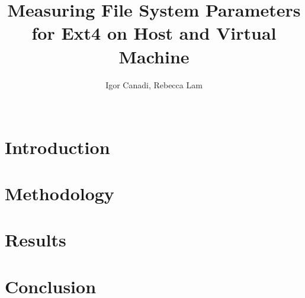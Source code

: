 \documentclass{sig-alternate}
\begin{document}
\title{Measuring File System Parameters for Ext4 on Host and Virtual Machine}

\author{
	\alignauthor Igor Canadi, Rebecca Lam\\
	\\
}

\maketitle



\section{Introduction}
\label{sec:intro}


\section{Methodology}
\label{sec:method}


\section{Results}
\label{sec:results}


\section{Conclusion}
\label{sec:conc}

\end{document}
